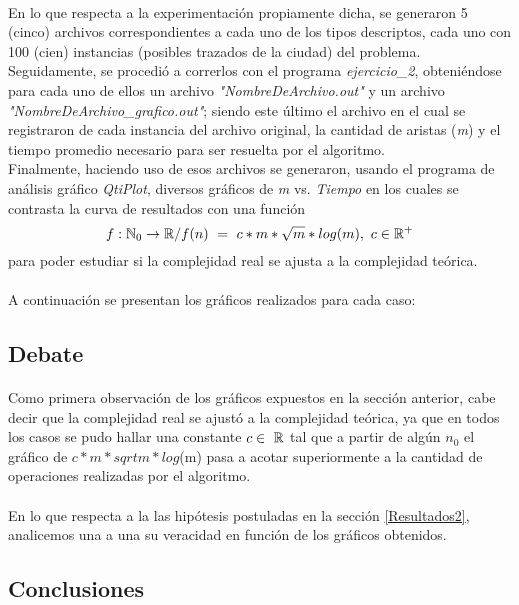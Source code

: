 \paragraph{}
En lo que respecta a la experimentación propiamente dicha, se generaron 5 (cinco) archivos correspondientes a cada uno de los tipos descriptos, cada uno con 100 (cien) instancias (posibles trazados de la ciudad) del problema. Seguidamente, se procedió a correrlos con el programa \textit{ejercicio\_2},  obteniéndose para cada uno de ellos un archivo \textit{"NombreDeArchivo.out"} y un archivo \textit{"NombreDeArchivo\_grafico.out"}; siendo este último el archivo en el cual se registraron de cada instancia del archivo original, la cantidad de aristas (\textit{m}) y el tiempo promedio necesario para ser resuelta por el algoritmo. \\
Finalmente, haciendo uso de esos archivos se generaron, usando el programa de análisis gráfico \textit{QtiPlot}, diversos gráficos de \textit{m} vs. \textit{Tiempo} en los cuales se contrasta la curva de resultados con una función 
	$$f: \mathbb{N}_0 \rightarrow \mathbb{R} / f(n)\ =\ c * m * \sqrt{m} * log(m),\ c \in \mathbb{R}^+$$
para poder estudiar si la complejidad real se ajusta a la complejidad teórica.

\paragraph{}
A continuación se presentan los gráficos realizados para cada caso:


\subsection{Debate}
\label{deb2}

\paragraph{}
Como primera observación de los gráficos expuestos en la sección anterior, cabe decir que la complejidad real se ajustó a la complejidad teórica, ya que en todos los casos se pudo hallar una constante $c \in\ \mathbb{R}$ tal que a partir de algún $n_0$ el gráfico de $c*m*sqrt{m}*log$(m) pasa a acotar superiormente a la cantidad de operaciones realizadas por el algoritmo.

\paragraph{}
En lo que respecta a la las hipótesis postuladas en la sección \ref{Resultados2}, analicemos una a una su veracidad en función de los gráficos obtenidos.\\


\subsection{Conclusiones}
\label{conc2}
